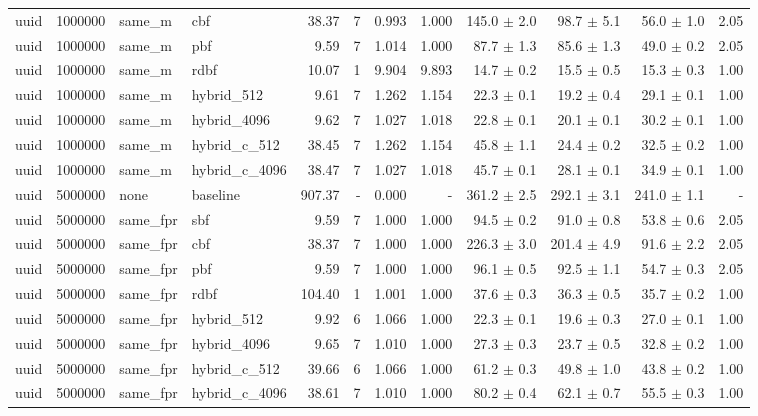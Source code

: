 \begin{tabular}{llllrrrrrrrr}
uuid & 1000000 & same\_m & cbf & 38.37 & 7 & 0.993 & 1.000 & 145.0 $\pm$ 2.0 & 98.7 $\pm$ 5.1 & 56.0 $\pm$ 1.0 & 2.05 \\
uuid & 1000000 & same\_m & pbf & 9.59 & 7 & 1.014 & 1.000 & 87.7 $\pm$ 1.3 & 85.6 $\pm$ 1.3 & 49.0 $\pm$ 0.2 & 2.05 \\
uuid & 1000000 & same\_m & rdbf & 10.07 & 1 & 9.904 & 9.893 & 14.7 $\pm$ 0.2 & 15.5 $\pm$ 0.5 & 15.3 $\pm$ 0.3 & 1.00 \\
uuid & 1000000 & same\_m & hybrid\_512 & 9.61 & 7 & 1.262 & 1.154 & 22.3 $\pm$ 0.1 & 19.2 $\pm$ 0.4 & 29.1 $\pm$ 0.1 & 1.00 \\
uuid & 1000000 & same\_m & hybrid\_4096 & 9.62 & 7 & 1.027 & 1.018 & 22.8 $\pm$ 0.1 & 20.1 $\pm$ 0.1 & 30.2 $\pm$ 0.1 & 1.00 \\
uuid & 1000000 & same\_m & hybrid\_c\_512 & 38.45 & 7 & 1.262 & 1.154 & 45.8 $\pm$ 1.1 & 24.4 $\pm$ 0.2 & 32.5 $\pm$ 0.2 & 1.00 \\
uuid & 1000000 & same\_m & hybrid\_c\_4096 & 38.47 & 7 & 1.027 & 1.018 & 45.7 $\pm$ 0.1 & 28.1 $\pm$ 0.1 & 34.9 $\pm$ 0.1 & 1.00 \\
uuid & 5000000 & none & baseline & 907.37 & - & 0.000 & - & 361.2 $\pm$ 2.5 & 292.1 $\pm$ 3.1 & 241.0 $\pm$ 1.1 & - \\
uuid & 5000000 & same\_fpr & sbf & 9.59 & 7 & 1.000 & 1.000 & 94.5 $\pm$ 0.2 & 91.0 $\pm$ 0.8 & 53.8 $\pm$ 0.6 & 2.05 \\
uuid & 5000000 & same\_fpr & cbf & 38.37 & 7 & 1.000 & 1.000 & 226.3 $\pm$ 3.0 & 201.4 $\pm$ 4.9 & 91.6 $\pm$ 2.2 & 2.05 \\
uuid & 5000000 & same\_fpr & pbf & 9.59 & 7 & 1.000 & 1.000 & 96.1 $\pm$ 0.5 & 92.5 $\pm$ 1.1 & 54.7 $\pm$ 0.3 & 2.05 \\
uuid & 5000000 & same\_fpr & rdbf & 104.40 & 1 & 1.001 & 1.000 & 37.6 $\pm$ 0.3 & 36.3 $\pm$ 0.5 & 35.7 $\pm$ 0.2 & 1.00 \\
uuid & 5000000 & same\_fpr & hybrid\_512 & 9.92 & 6 & 1.066 & 1.000 & 22.3 $\pm$ 0.1 & 19.6 $\pm$ 0.3 & 27.0 $\pm$ 0.1 & 1.00 \\
uuid & 5000000 & same\_fpr & hybrid\_4096 & 9.65 & 7 & 1.010 & 1.000 & 27.3 $\pm$ 0.3 & 23.7 $\pm$ 0.5 & 32.8 $\pm$ 0.2 & 1.00 \\
uuid & 5000000 & same\_fpr & hybrid\_c\_512 & 39.66 & 6 & 1.066 & 1.000 & 61.2 $\pm$ 0.3 & 49.8 $\pm$ 1.0 & 43.8 $\pm$ 0.2 & 1.00 \\
uuid & 5000000 & same\_fpr & hybrid\_c\_4096 & 38.61 & 7 & 1.010 & 1.000 & 80.2 $\pm$ 0.4 & 62.1 $\pm$ 0.7 & 55.5 $\pm$ 0.3 & 1.00 \\

\end{tabular}
